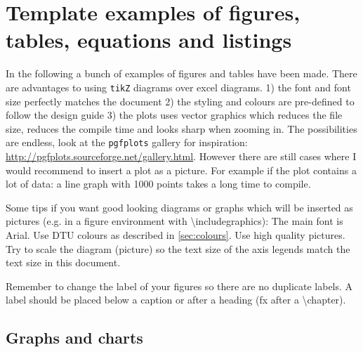 \chapter{Template examples of figures, tables, equations and listings}
In the following a bunch of examples of figures and tables have been made. There are advantages to using \texttt{tikZ} diagrams over excel diagrams. 1) the font and font size perfectly matches the document 2) the styling and colours are pre-defined to follow the design guide 3) the plots uses vector graphics which reduces the file size, reduces the compile time and looks sharp when zooming in. The possibilities are endless, look at the \texttt{pgfplots} gallery for inspiration: \url{http://pgfplots.sourceforge.net/gallery.html}.
However there are still cases where I would recommend to insert a plot as a picture. For example if the plot contains a lot of data: a line graph with 1000 points takes a long time to compile.

Some tips if you want good looking diagrams or graphs which will be inserted as pictures (e.g. in a figure environment with \textbackslash includegraphics): The main font is Arial. Use DTU colours as described in \cref{sec:colours}. Use high quality pictures. Try to scale the diagram (picture) so the text size of the axis legends match the text size in this document.

Remember to change the label of your figures so there are no duplicate labels. A label should be placed below a caption or after a heading (fx after a \textbackslash chapter).

\section{Graphs and charts}

\stackedColumnData

